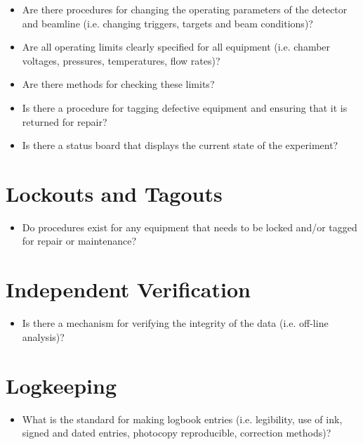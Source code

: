 \begin{itemize}
\item   Are there procedures for changing the operating parameters of the detector and 
beamline (i.e. changing triggers, targets and beam conditions)?

\item   Are all operating limits clearly specified for all equipment (i.e. chamber voltages, 
pressures, temperatures, flow rates)?

\item   Are there methods for checking these limits?

\item   Is there a procedure for tagging defective equipment and ensuring that it is 
returned for repair?

\item   Is there a status board that displays the current state of the experiment?

\end{itemize}

\section{Lockouts and Tagouts}


\begin{itemize}
\item   Do procedures exist for any equipment that needs to be  locked and/or tagged for 
repair or maintenance?

\end{itemize}

\section{Independent Verification}


\begin{itemize}
\item   Is there a mechanism for verifying the integrity of the data (i.e. off-line analysis)?

\end{itemize}

\section{Logkeeping}

\begin{itemize}
\item   What is the standard for making logbook entries (i.e. legibility, use of ink, signed 
and dated entries, photocopy reproducible, correction methods)?

\end{itemize}

